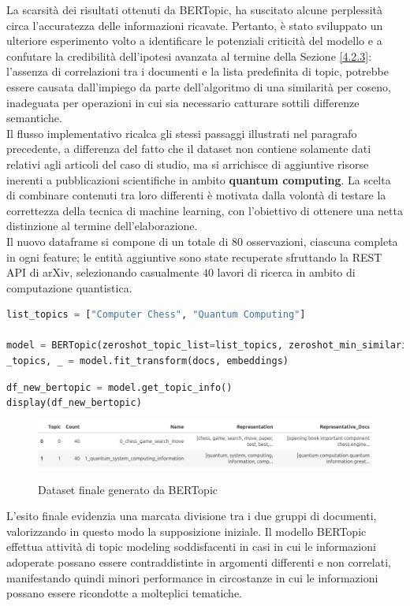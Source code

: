 La scarsità dei risultati ottenuti da BERTopic, ha suscitato alcune perplessità circa l'accuratezza delle informazioni ricavate. Pertanto, è stato sviluppato un ulteriore esperimento volto a identificare le potenziali criticità del modello e a confutare la credibilità dell'ipotesi avanzata al termine della Sezione \ref{4.2.3}: l'assenza di correlazioni tra i documenti e la lista predefinita di topic, potrebbe essere causata dall'impiego da parte dell'algoritmo di una similarità per coseno, inadeguata per operazioni in cui sia necessario catturare sottili differenze semantiche. \vspace{7pt} \\
Il flusso implementativo ricalca gli stessi passaggi illustrati nel paragrafo precedente, a differenza del fatto che il dataset non contiene solamente dati relativi agli articoli del caso di studio, ma si arrichisce di aggiuntive risorse inerenti a pubblicazioni scientifiche in ambito \textbf{quantum computing}. La scelta di combinare contenuti tra loro differenti è motivata dalla volontà di testare la correttezza della tecnica di machine learning, con l'obiettivo di ottenere una netta distinzione al termine dell'elaborazione. \vspace{7pt} \\
Il nuovo dataframe si compone di un totale di $80$ osservazioni, ciascuna completa in ogni feature; le entità aggiuntive sono state recuperate sfruttando la REST API di arXiv, selezionando casualmente $40$ lavori di ricerca in ambito di computazione quantistica.
\begin{lstlisting}[language=python, caption=Creazione e fitting del modello secondo il nuovo dataset]
list_topics = ["Computer Chess", "Quantum Computing"]

model = BERTopic(zeroshot_topic_list=list_topics, zeroshot_min_similarity=.6)
_topics, _ = model.fit_transform(docs, embeddings)
\end{lstlisting}
\begin{lstlisting}[language=python, caption=Recupero e visualizzazione del nuovo dataset finale generato da BERTopic]
df_new_bertopic = model.get_topic_info()
display(df_new_bertopic)
\end{lstlisting}
\begin{figure}[H]
    \centering
    \includegraphics[width=1.0\linewidth]{img/img8.png}
    \label{4.2}
    \caption{Dataset finale generato da BERTopic}
\end{figure}
L'esito finale evidenzia una marcata divisione tra i due gruppi di documenti, valorizzando in questo modo la supposizione iniziale. Il modello BERTopic effettua attività di topic modeling soddisfacenti in casi in cui le informazioni adoperate possano essere contraddistinte in argomenti differenti e non correlati, manifestando quindi minori performance in circostanze in cui le informazioni possano essere ricondotte a molteplici tematiche.
